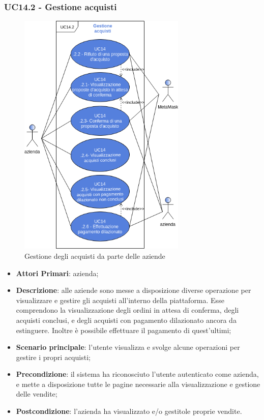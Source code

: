 \subsubsection{UC14.2 - Gestione acquisti}
\begin{figure}[h]
	\includegraphics[width=8cm]{res/images/UC14-Acquisti.png}
	\centering
	\caption{Gestione degli acquisti da parte delle aziende}
\end{figure}
\begin{itemize}
	\item \textbf{Attori Primari}: azienda;
	\item \textbf{Descrizione}: alle aziende sono messe a disposizione diverse operazione per visualizzare e gestire gli acquisti all'interno della piattaforma. Esse comprendono la visualizzazione degli ordini in attesa di conferma, degli acquisti conclusi, e degli acquisti con pagamento dilazionato ancora da estinguere. Inoltre è possibile effettuare il pagamento di quest'ultimi;
	\item \textbf{Scenario principale}: l'utente visualizza e svolge alcune operazioni per gestire i propri acquisti;
	\item \textbf{Precondizione}: il sistema ha riconosciuto l'utente autenticato come azienda, e mette a disposizione tutte le pagine necessarie alla visualizzazione e gestione delle vendite;
	\item \textbf{Postcondizione}: l'azienda ha visualizzato e/o gestitole proprie vendite.
\end{itemize} 
